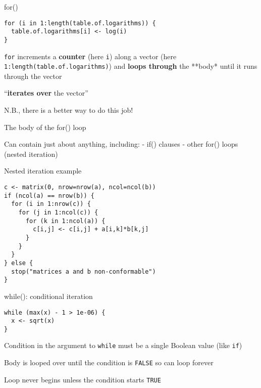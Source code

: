 \documentclass[8pt,ignorenonframetext,]{beamer}
\begin{document}
\begin{frame}[fragile]{for()}

\begin{verbatim}
for (i in 1:length(table.of.logarithms)) {
  table.of.logarithms[i] <- log(i)
}
\end{verbatim}

\texttt{for} increments a \textbf{counter} (here \texttt{i}) along a
vector (here \texttt{1:length(table.of.logarithms)}) and \textbf{loops
through} the **body* until it runs through the vector

``\textbf{iterates over} the vector''

N.B., there is a better way to do this job!

\end{frame}

\begin{frame}{The body of the for() loop}

Can contain just about anything, including: - if() clauses - other for()
loops (nested iteration)

\end{frame}

\begin{frame}[fragile]{Nested iteration example}

\begin{verbatim}
c <- matrix(0, nrow=nrow(a), ncol=ncol(b))
if (ncol(a) == nrow(b)) {
  for (i in 1:nrow(c)) {
    for (j in 1:ncol(c)) {
      for (k in 1:ncol(a)) {
        c[i,j] <- c[i,j] + a[i,k]*b[k,j]
      }
    }
  }
} else {
  stop("matrices a and b non-conformable")
}
\end{verbatim}

\end{frame}

\begin{frame}[fragile]{while(): conditional iteration}

\begin{verbatim}
while (max(x) - 1 > 1e-06) {
  x <- sqrt(x)
}
\end{verbatim}

Condition in the argument to \texttt{while} must be a single Boolean
value (like \texttt{if})

Body is looped over until the condition is \texttt{FALSE} so can loop
forever

Loop never begins unless the condition starts \texttt{TRUE}

\end{frame}
\end{document}
